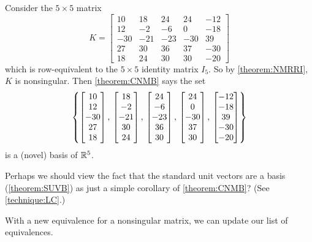\documentclass{ximera}
\begin{document}
\begin{example}
  Consider the $5\times 5$ matrix
  \[
    K=\begin{bmatrix}
      10 & 18 & 24 & 24 & -12 \\
      12 & -2 &  -6 & 0 & -18 \\
      -30 &  -21 & -23 &  -30 & 39 \\
      27 & 30 &  36 & 37 &  -30 \\
      18 & 24 & 30 &  30 & -20
    \end{bmatrix}
  \]
  which is row-equivalent to the $5\times 5$ identity matrix $I_5$.
  So by \ref{theorem:NMRRI}, $K$ is nonsingular.  Then
  \ref{theorem:CNMB} says the set
  \[
    \left\{\begin{bmatrix}10\\12\\-30\\27\\18\end{bmatrix},\,\begin{bmatrix}18\\-2\\-21\\30\\24\end{bmatrix},\,\begin{bmatrix}24\\-6\\-23\\36\\30\end{bmatrix},\,\begin{bmatrix}24\\0\\-30\\37\\30\end{bmatrix},\,\begin{bmatrix}-12\\-18\\39\\-30\\-20\end{bmatrix}\right\}
  \]
  is a (novel) basis of $\mathbb{R}^{5}$.
\end{example}

Perhaps we should view the fact that the standard unit vectors are a
basis (\ref{theorem:SUVB}) as just a simple corollary of
\ref{theorem:CNMB}?  (See \ref{technique:LC}.)

With a new equivalence for a nonsingular matrix, we can update our list of equivalences.
\end{document}
